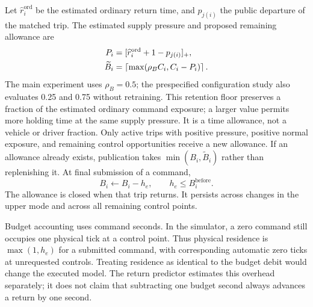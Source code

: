 Let $\widehat r_i^{\mathrm{ord}}$ be the estimated ordinary return time, and $p_{j(i)}$ the public departure of the matched trip. The estimated supply pressure and proposed remaining allowance are
\begin{align}
 P_i&=[\widehat r_i^{\mathrm{ord}}+1-p_{j(i)}]_+,\\
 \widetilde B_i&=\left\lceil\max(\rho_B C_i,C_i-P_i)\right\rceil.
 \label{eq:budget}
\end{align}
The main experiment uses $\rho_B=0.5$; the prespecified configuration study also evaluates 0.25 and 0.75 without retraining. This retention floor preserves a fraction of the estimated ordinary command exposure; a larger value permits more holding time at the same supply pressure. It is a time allowance, not a vehicle or driver fraction. Only active trips with positive pressure, positive normal exposure, and remaining control opportunities receive a new allowance. If an allowance already exists, publication takes $\min(B_i,\widetilde B_i)$ rather than replenishing it. At final submission of a command,
\begin{equation}
 B_i\leftarrow B_i-h_e,\qquad h_e\leq B_i^{\mathrm{before}}.
 \label{eq:debit}
\end{equation}
The allowance is closed when that trip returns. It persists across changes in the upper mode and across all remaining control points.

Budget accounting uses command seconds. In the simulator, a zero command still occupies one physical tick at a control point. Thus physical residence is $\max(1,h_e)$ for a submitted command, with corresponding automatic zero ticks at unrequested controls. Treating residence as identical to the budget debit would change the executed model. The return predictor estimates this overhead separately; it does not claim that subtracting one budget second always advances a return by one second.

